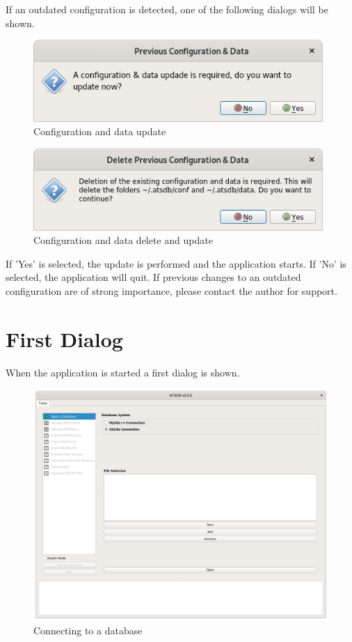 If an outdated configuration is detected, one of the following dialogs will be shown.

\begin{figure}[H]
    \includegraphics[width=11cm]{../screenshots/config_data_update.png}
  \caption{Configuration and data update}
\end{figure}

\begin{figure}[H]
    \includegraphics[width=11cm]{../screenshots/config_data_delete_update.png}
  \caption{Configuration and data delete and update}
\end{figure}

If 'Yes' is selected, the update is performed and the application starts. If 'No' is selected, the application will quit. If previous changes to an outdated configuration are of strong importance, please contact the author for support. 

\section{First Dialog}

When the application is started a first dialog is shown. 

\begin{figure}[H]
  \hspace*{-2cm}
    \includegraphics[width=18cm]{../screenshots/db_config_connect.png}
  \caption{Connecting to a database}
\end{figure}

